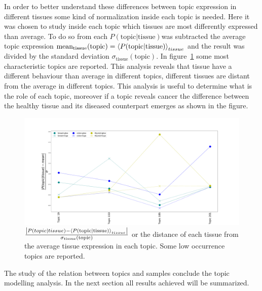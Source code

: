 In order to better understand these differences between topic expression in different tissues some kind of normalization inside each topic is needed. Here it was chosen to study inside each topic which tissues are most differently expressed than average. To do so from each $P(\text{topic}| \text{tissue})$was subtracted the average topic expression $\text{mean}_{\text{tissue}}(\text{topic})=\left\langle P(\text{topic}| \text{tissue})\right\rangle_{tissue}$ and the result was divided by the standard deviation $\sigma_{\text{tissue}}(\text{topic})$. In figure~\ref{fig:topic/merged/lifeplot_normalised_level3_hd} some most characteristic topics are reported. This analysis reveals that tissue have a different behaviour than average in different topics, different tissues are distant from the average in different topics. This 
analysis is useful to determine what is the role of each topic, moreover if a topic reveals cancer the difference between the healthy tissue and its diseased counterpart emerges as shown in the figure.
\begin{figure}[htb!]
	\centering
	\includegraphics[width=0.85\linewidth]{pictures/topic/merged/lifeplot_normalised_level3_hd.pdf}
	\caption{$\frac{\left|P(topic | tissue) - \left\langle P(\text{topic}| \text{tissue})\right\rangle_{tissue}\right|}{\sigma_{\text{tissue}}(\text{topic})}$ or the distance of each tissue from the average tissue expression in each topic. Some low occurrence topics are reported.}
	\label{fig:topic/merged/lifeplot_normalised_level3_hd}
\end{figure}

The study of the relation between topics and samples conclude the topic modelling analysis. In the next section all results achieved will be summarized.